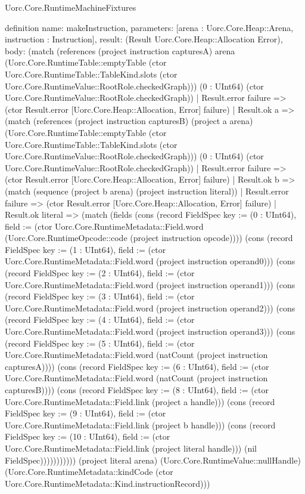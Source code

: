 \begin{lexlean}{Uorc.Core.RuntimeMachineFixtures}
\begin{semanticmodule}
definition{
  name: makeInstruction,
  parameters: [arena : Uorc.Core.Heap::Arena, instruction : Instruction],
  result: (Result Uorc.Core.Heap::Allocation Error),
  body: (match (references (project instruction capturesA) arena (Uorc.Core.RuntimeTable::emptyTable (ctor Uorc.Core.RuntimeTable::TableKind.slots (ctor Uorc.Core.RuntimeValue::RootRole.checkedGraph))) (0 : UInt64) (ctor Uorc.Core.RuntimeValue::RootRole.checkedGraph))
    | Result.error failure => (ctor Result.error [Uorc.Core.Heap::Allocation, Error] failure)
    | Result.ok a => (match (references (project instruction capturesB) (project a arena) (Uorc.Core.RuntimeTable::emptyTable (ctor Uorc.Core.RuntimeTable::TableKind.slots (ctor Uorc.Core.RuntimeValue::RootRole.checkedGraph))) (0 : UInt64) (ctor Uorc.Core.RuntimeValue::RootRole.checkedGraph))
      | Result.error failure => (ctor Result.error [Uorc.Core.Heap::Allocation, Error] failure)
      | Result.ok b => (match (sequence (project b arena) (project instruction literal))
        | Result.error failure => (ctor Result.error [Uorc.Core.Heap::Allocation, Error] failure)
        | Result.ok literal => (match (fields (cons (record FieldSpec {key := (0 : UInt64), field := (ctor Uorc.Core.RuntimeMetadata::Field.word (Uorc.Core.RuntimeOpcode::code (project instruction opcode)))}) (cons (record FieldSpec {key := (1 : UInt64), field := (ctor Uorc.Core.RuntimeMetadata::Field.word (project instruction operand0))}) (cons (record FieldSpec {key := (2 : UInt64), field := (ctor Uorc.Core.RuntimeMetadata::Field.word (project instruction operand1))}) (cons (record FieldSpec {key := (3 : UInt64), field := (ctor Uorc.Core.RuntimeMetadata::Field.word (project instruction operand2))}) (cons (record FieldSpec {key := (4 : UInt64), field := (ctor Uorc.Core.RuntimeMetadata::Field.word (project instruction operand3))}) (cons (record FieldSpec {key := (5 : UInt64), field := (ctor Uorc.Core.RuntimeMetadata::Field.word (natCount (project instruction capturesA)))}) (cons (record FieldSpec {key := (6 : UInt64), field := (ctor Uorc.Core.RuntimeMetadata::Field.word (natCount (project instruction capturesB)))}) (cons (record FieldSpec {key := (8 : UInt64), field := (ctor Uorc.Core.RuntimeMetadata::Field.link (project a handle))}) (cons (record FieldSpec {key := (9 : UInt64), field := (ctor Uorc.Core.RuntimeMetadata::Field.link (project b handle))}) (cons (record FieldSpec {key := (10 : UInt64), field := (ctor Uorc.Core.RuntimeMetadata::Field.link (project literal handle))}) (nil FieldSpec))))))))))) (project literal arena) (Uorc.Core.RuntimeValue::nullHandle) (Uorc.Core.RuntimeMetadata::kindCode (ctor Uorc.Core.RuntimeMetadata::Kind.instructionRecord)))
}
\end{semanticmodule}
\end{lexlean}
